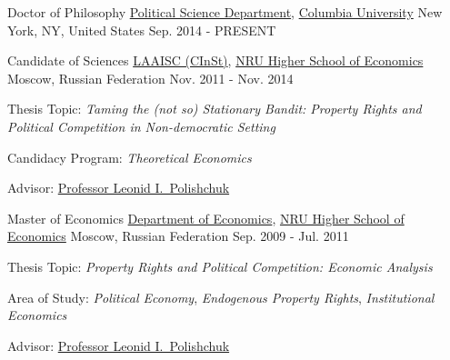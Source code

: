 

\begin{cventries}

\cventry
    {Doctor of Philosophy} %
    {\href{http://polisci.columbia.edu/}{Political Science Department}, \href{http://www.columbia.edu/}{Columbia University}} %
    {New York, NY, United States} %
    {Sep. 2014 - PRESENT} %
    {
    }

\cventry
    {Candidate of Sciences} %
    {\href{http://isc.hse.ru/about_eng}{LAAISC (CInSt)}, \href{http://www.hse.ru/en/}{NRU Higher School of Economics}} %
    {Moscow, Russian Federation} %
    {Nov. 2011 - Nov. 2014} %
    {
      \begin{cvitems} %
        \item {Thesis Topic: \emph{Taming the (not so) Stationary Bandit: Property Rights and Political Competition in Non-democratic Setting}}
        \item {Candidacy Program: \emph{Theoretical Economics}}
        \item {Advisor: \href{http://www.hse.ru/en/org/persons/65104}{Professor Leonid I.~Polishchuk}}
      \end{cvitems}
    }

\cventry
    {Master of Economics} %
    {\href{http://economics.hse.ru/en/}{Department of Economics}, \href{http://www.hse.ru/en/}{NRU Higher School of Economics}} %
    {Moscow, Russian Federation} %
    {Sep. 2009 - Jul. 2011} %
    {
      \begin{cvitems} %
        \item {Thesis Topic: \emph{Property Rights and Political Competition: Economic Analysis}}
        \item {Area of Study: \emph{Political Economy}, \emph{Endogenous Property Rights}, \emph{Institutional Economics}}
        \item {Advisor: \href{http://www.hse.ru/en/org/persons/65104}{Professor Leonid I.~Polishchuk}}
      \end{cvitems}
    }


\end{cventries}

